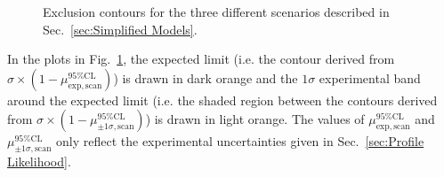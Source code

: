 \documentclass[dissertation.tex]{subfiles}
\begin{document}
\begin{figure}
	\hspace{1cm}
	\caption{Exclusion contours for the three different scenarios described in Sec.~\ref{sec:Simplified Models}.}
	\label{fig:exclusion_contours}
\end{figure}

In the plots in Fig.~\ref{fig:exclusion_contours}, the expected limit (i.e. the contour derived from $\sigma\times(1 - \mu_{\mathrm{exp,scan}}^{95\%\mathrm{CL}})$) is drawn in dark orange and the $1\sigma$ experimental band around the expected limit (i.e. the shaded region between the contours derived from $\sigma\times(1 - \mu^{95\%\mathrm{CL}}_{\pm1\sigma\mathrm{,scan}})$) is drawn in light orange.  The values of $\mu_{\mathrm{exp,scan}}^{95\%\mathrm{CL}}$ and $\mu^{95\%\mathrm{CL}}_{\pm1\sigma\mathrm{,scan}}$ only reflect the experimental uncertainties given in Sec.~\ref{sec:Profile Likelihood}.
\end{document}
